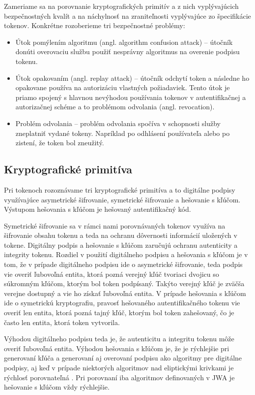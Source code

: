 Zameriame sa na porovnanie kryptografických primitív a z nich vyplývajúcich bezpečnostných kvalít a na náchylnosť na zraniteľnosti vyplývajúce zo špecifikácie tokenov. Konkrétne rozoberieme tri bezpečnostné problémy:


\begin{itemize}
  \item Útok pomýlením algoritmu (angl. algorithm confusion attack) -- útočník donúti overovaciu službu použiť nesprávny algoritmus na overenie podpisu tokenu. 
  \item Útok opakovaním (angl. replay attack) -- útočník odchytí token a následne ho opakovane používa na autorizáciu vlastných požiadaviek. Tento útok je priamo spojený s hlavnou nevýhodou používania tokenov v autentifikačnej a autorizačnej schéme a to problémom odvolania (angl. revocation).
  \item Problém odvolania -- problém odvolania spočíva v schopnosti služby zneplatniť vydané tokeny. Napríklad po odhlásení používateľa alebo po zistení, že token bol zneužitý.
\end{itemize}


\subsection{Kryptografické primitíva}

Pri tokenoch rozoznávame tri kryptografické primitíva a to digitálne podpisy využívajúce asymetrické šifrovanie, symetrické šifrovanie a hešovanie s kľúčom. Výstupom hešovania s kľúčom je hešovaný autentifikačný kód.

Symetrické šifrovanie sa v rámci nami porovnávaných tokenov využíva na šifrovanie obsahu tokenu a teda na ochranu dôvernosti informácií uložených v tokene. Digitálny podpis a hešovanie s kľúčom zaručujú ochranu autenticity a integrity tokenu. Rozdiel v použití digitálneho podpisu a hešovania s kľúčom je v tom, že v prípade digitálneho podpisu ide o asymetrické šifrovanie, teda  podpis vie overiť ľubovoľná entita, ktorá pozná verejný kľúč tvoriaci dvojicu so súkromným kľúčom, ktorým bol token podpísaný. Takýto verejný kľúč je zväčša verejne dostupný a vie ho získať ľubovoľná entita. V prípade hešovania s kľúčom ide o symetrickú kryptografiu, pravosť hešovaného autentifikačného tokenu vie overiť len entita, ktorá pozná tajný kľúč, ktorým bol token zahešovaný, čo je často len entita, ktorá token vytvorila.

Výhodou digitálneho podpisu teda je, že autenticitu a integritu tokenu môže overiť ľubovoľná entita. Výhodou hešovania s kľúčom je, že je rýchlejšie pri generovaní kľúča a generovaní aj overovaní podpisu ako algoritmy pre digitálne podpisy, aj keď v prípade niektorých algoritmov nad eliptickými krivkami je rýchlosť porovnateľná \cite{hmac_perf}. Pri porovnaní iba algoritmov definovaných v JWA \cite{hmac_jwt_perf} je hešovanie s kľúčom vždy rýchlejšie.

